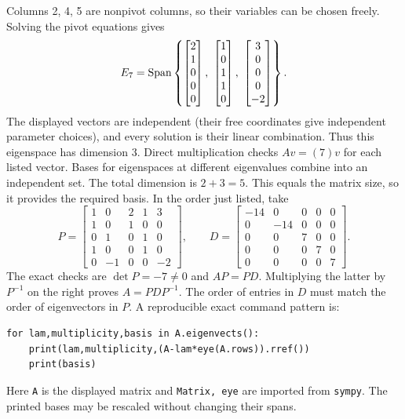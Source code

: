 Columns 2, 4, 5 are nonpivot columns, so their variables can be chosen freely. Solving the pivot equations gives
\[E_{7}=\Span\left\{\begin{bmatrix}2\\1\\0\\0\\0\end{bmatrix},\ \begin{bmatrix}1\\0\\1\\1\\0\end{bmatrix},\ \begin{bmatrix}3\\0\\0\\0\\-2\end{bmatrix}\right\}.\]
The displayed vectors are independent (their free coordinates give independent parameter choices), and every solution is their linear combination. Thus this eigenspace has dimension $3$. Direct multiplication checks $Av=(7)v$ for each listed vector.
Bases for eigenspaces at different eigenvalues combine into an independent set. The total dimension is $2+3=5$.
This equals the matrix size, so it provides the required basis. In the order just listed, take
\[P=\begin{bmatrix}1&0&2&1&3\\1&0&1&0&0\\0&1&0&1&0\\1&0&0&1&0\\0&-1&0&0&-2\end{bmatrix},\qquad D=\begin{bmatrix}-14&0&0&0&0\\0&-14&0&0&0\\0&0&7&0&0\\0&0&0&7&0\\0&0&0&0&7\end{bmatrix}.\]
The exact checks are $\det P=-7\ne0$ and $AP=PD$. Multiplying the latter by $P^{-1}$ on the right proves $A=PDP^{-1}$. The order of entries in $D$ must match the order of eigenvectors in $P$.
A reproducible exact command pattern is:
\begin{verbatim}
for lam,multiplicity,basis in A.eigenvects():
    print(lam,multiplicity,(A-lam*eye(A.rows)).rref())
    print(basis)
\end{verbatim}
Here \texttt{A} is the displayed matrix and \texttt{Matrix, eye} are imported from \texttt{sympy}. The printed bases may be rescaled without changing their spans.

